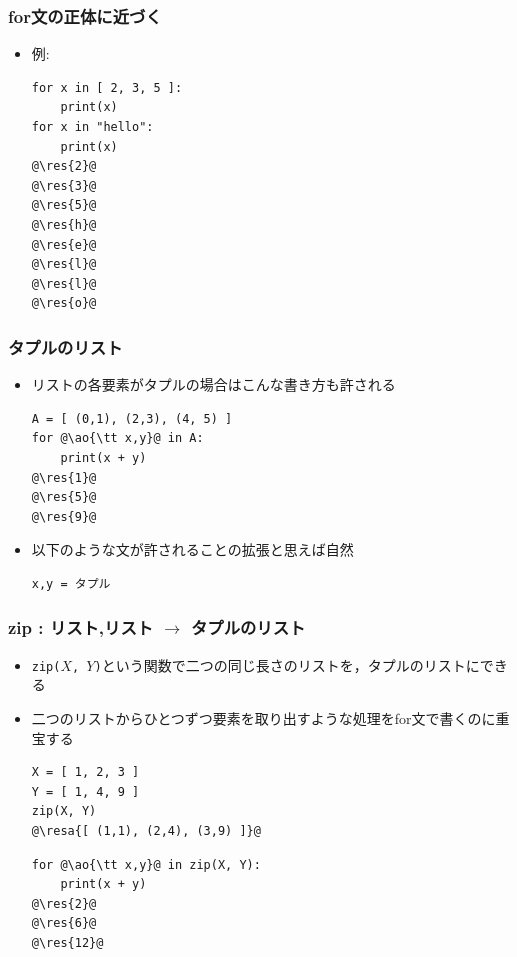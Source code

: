 \documentclass[10pt,dvipdfmx]{beamer}
\newcommand{\ore}[1]{{\color{orange}#1}}
\newcommand{\ao}[1]{{\color{blue}#1}}
\newcommand{\resa}[1]{\ore{\textsl{$\rightarrow$ #1}}}
\newcommand{\res}[1]{\ore{\textsl{#1}}}
\begin{document}
\begin{frame}[fragile]
\frametitle{for文の正体に近づく}
\begin{itemize}
\item 例:
\begin{lstlisting}
for x in [ 2, 3, 5 ]:
    print(x)
for x in "hello":
    print(x)
@\res{2}@
@\res{3}@
@\res{5}@
@\res{h}@
@\res{e}@
@\res{l}@
@\res{l}@
@\res{o}@
\end{lstlisting}
\end{itemize}
\end{frame}


\begin{frame}[fragile]
\frametitle{タプルのリスト}
\begin{itemize}
\item リストの各要素がタプルの場合はこんな書き方も許される
\begin{lstlisting}
A = [ (0,1), (2,3), (4, 5) ]
for @\ao{\tt x,y}@ in A:
    print(x + y)
@\res{1}@
@\res{5}@
@\res{9}@
\end{lstlisting}

\item 以下のような文が許されることの拡張と思えば自然
\begin{lstlisting}
x,y = タプル
\end{lstlisting}
\end{itemize}
\end{frame}


\begin{frame}[fragile]
\frametitle{zip : リスト,リスト $\rightarrow$ タプルのリスト}
\begin{itemize}
\item \ao{\tt zip($X$, $Y$)}という関数で二つの同じ長さのリストを，タプルのリストにできる
\item 二つのリストからひとつずつ要素を取り出すような処理をfor文で書くのに重宝する
\begin{lstlisting}
X = [ 1, 2, 3 ]
Y = [ 1, 4, 9 ]
zip(X, Y)
@\resa{[ (1,1), (2,4), (3,9) ]}@
\end{lstlisting}

\begin{lstlisting}
for @\ao{\tt x,y}@ in zip(X, Y):
    print(x + y)
@\res{2}@
@\res{6}@
@\res{12}@
\end{lstlisting}
\end{itemize}
\end{frame}
\end{document}
